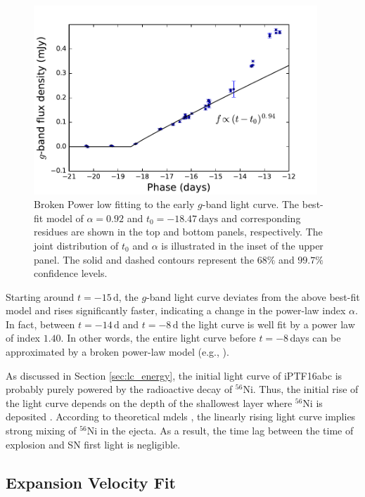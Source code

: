\documentclass[twocolumn]{aastex61}
\begin{document}
\begin{figure}[htb]
  \centering
  \includegraphics[width=0.95\textwidth]{early_lc.pdf}
  \caption{Broken Power low fitting to the early $g$-band light
    curve. The best-fit model of $\alpha=0.92$ and $t_0=-18.47\,\textrm{days}$
    and corresponding residues are shown in the top and bottom panels, respectively.
    The joint distribution of $t_0$ and $\alpha$ is illustrated in the inset of
    the upper panel. The solid and dashed contours represent the $68\%$ and $99.7\%$
    confidence levels.
  }
  \label{fig:early_lc_fit}
\end{figure}

Starting around $t=-15\,\textrm{d}$, the $g$-band light curve 
deviates from the above best-fit model and 
rises significantly faster, indicating a
change in the power-law index $\alpha$. In fact, between $t=-14\,\mathrm{d}$ and $t=-8\,\mathrm{d}$ the light curve is well fit by a power law of index $1.40$. In other words, the entire light curve
before $t=-8$\,days can be approximated by a broken power-law model
(e.g.,
\citealt{2013ApJ...778L..15Z,2014ApJ...783L..24Z,2016arXiv161202097Z,
  2016arXiv161202725Z}).

As discussed in Section \ref{sec:lc_energy}, the initial light curve
of iPTF16abc is probably purely powered by the radioactive decay of
$^{56}$Ni. Thus, the initial rise of the light curve depends on
the depth of the shallowest layer where $^{56}$Ni is deposited
\citep{2014ApJ...784...85P}. According to theoretical mdels
\citep{2016ApJ...826...96P}, the linearly rising light curve implies
strong mixing of $^{56}$Ni in the ejecta. As a result, the time lag
between the time of explosion and SN first light is negligible.

\subsection{Expansion Velocity Fit}
\label{sec:early_vel}
\end{document}
